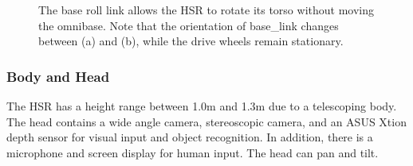 \documentclass[11pt]{article}
\begin{document}
            \begin{figure}[ht]
                \centering
                \quad
                \caption{The base roll link allows the HSR to rotate its torso without moving the omnibase. Note that the orientation of base\_link changes between (a) and (b), while the drive wheels remain stationary.}
                \label{fig:base_roll_fig}
            \end{figure}
        
    
        \subsubsection{Body and Head} 
            The HSR has a height range between 1.0m and 1.3m due to a telescoping body. The head contains a wide angle camera, stereoscopic camera, and an ASUS Xtion depth sensor for visual input and object recognition. In addition, there is a microphone and screen display for human input. The head can pan and tilt.
\end{document}

